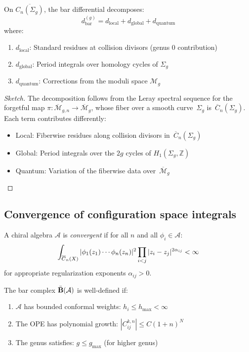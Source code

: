 \begin{theorem}
\label{thm:period-integrals-bar}
On $\overline{C_n(\Sigma_g)}$, the bar differential decomposes:
\[
d_{\text{bar}}^{(g)} = d_{\text{local}} + d_{\text{global}} + d_{\text{quantum}}
\]
where:
\begin{enumerate}
\item $d_{\text{local}}$: Standard residues at collision divisors (genus 0 contribution)
\item $d_{\text{global}}$: Period integrals over homology cycles of $\Sigma_g$
\item $d_{\text{quantum}}$: Corrections from the moduli space $\mathcal{M}_g$
\end{enumerate}
\end{theorem}

\begin{proof}[Sketch]
The decomposition follows from the Leray spectral sequence for the forgetful map
$\pi\colon \overline{\mathcal{M}}_{g,n} \to \overline{\mathcal{M}}_g$,
whose fiber over a smooth curve~$\Sigma_g$ is~$\overline{C}_n(\Sigma_g)$.
Each term contributes differently:
\begin{itemize}
\item Local: Fiberwise residues along collision divisors in~$\overline{C}_n(\Sigma_g)$
\item Global: Period integrals over the $2g$ cycles of $H_1(\Sigma_g, \mathbb{Z})$
\item Quantum: Variation of the fiberwise data over~$\overline{\mathcal{M}}_g$
\end{itemize}
\end{proof}

\subsection{Convergence of configuration space integrals}

\begin{definition}
A chiral algebra $\mathcal{A}$ is \emph{convergent} if for all $n$ and all $\phi_i \in \mathcal{A}$:
\[\int_{\overline{C}_{n}(X)} |\phi_1(z_1) \cdots \phi_n(z_n)|^2 \prod_{i<j} |z_i - z_j|^{2\alpha_{ij}} < \infty\]
for appropriate regularization exponents $\alpha_{ij} > 0$.
\end{definition}

\begin{theorem}\label{thm:FM-convergence}
The bar complex $\bar{\mathbf{B}}(\mathcal{A})$ is well-defined if:
\begin{enumerate}
\item $\mathcal{A}$ has bounded conformal weights: $h_i \leq h_{\max} < \infty$
\item The OPE has polynomial growth: $|C_{ij}^{k,n}| \leq C(1 + n)^N$
\item The genus satisfies: $g \leq g_{\max}$ (for higher genus)
\end{enumerate}
\end{theorem}


